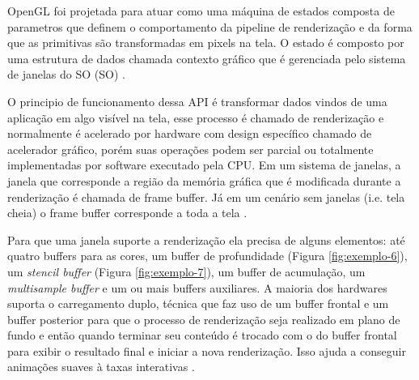 OpenGL foi projetada para atuar como uma máquina de estados composta de parametros que definem o comportamento da pipeline de renderização e da forma que as primitivas são transformadas em pixels na tela. O estado é composto por uma estrutura de dados chamada contexto gráfico que é gerenciada pelo sistema de janelas do SO (\acrlong{SO}) \cite{GLSLBook}. 

O principio de funcionamento dessa API é transformar dados vindos de uma aplicação em algo visível na tela, esse processo é chamado de renderização e normalmente é acelerado por hardware com design específico chamado de acelerador gráfico, porém suas operações podem ser parcial ou totalmente implementadas por software executado pela CPU. Em um sistema de janelas, a janela que corresponde a região da memória gráfica que é modificada durante a renderização é chamada de frame buffer. Já em um cenário sem janelas (i.e. tela cheia) o frame buffer corresponde a toda a tela \cite{GLSLBook}.

Para que uma janela suporte a renderização ela precisa de alguns elementos: até quatro buffers para as cores, um buffer de profundidade (Figura \ref{fig:exemplo-6}), um \textit{stencil buffer} (Figura \ref{fig:exemplo-7}), um buffer de acumulação, um \textit{multisample buffer} e um ou mais buffers auxiliares. A maioria dos hardwares suporta o carregamento duplo, técnica que faz uso de um buffer frontal e um buffer posterior para que o processo de renderização seja realizado em plano de fundo e então quando terminar seu conteúdo é trocado com o do buffer frontal para exibir o resultado final e iniciar a nova renderização. Isso ajuda a conseguir animações suaves à taxas interativas \cite{GLSLBook}.

\begin{figure}[h!]
	\centering
\end{figure}
\nocite{dptbuf}

